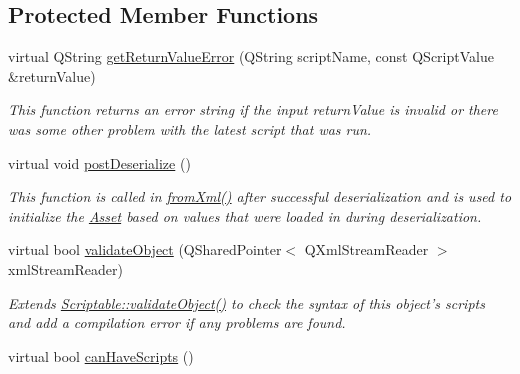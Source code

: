 \subsection*{Protected Member Functions}
\begin{DoxyCompactItemize}
\item 
virtual Q\-String \hyperlink{class_picto_1_1_script_controller_aa4cc92c24d03887890452e350cf5aac4}{get\-Return\-Value\-Error} (Q\-String script\-Name, const Q\-Script\-Value \&return\-Value)
\begin{DoxyCompactList}\small\item\em This function returns an error string if the input return\-Value is invalid or there was some other problem with the latest script that was run. \end{DoxyCompactList}\item 
virtual void \hyperlink{class_picto_1_1_script_controller_a8f67155393f4a6ee394120b5008befab}{post\-Deserialize} ()
\begin{DoxyCompactList}\small\item\em This function is called in \hyperlink{class_picto_1_1_asset_a8bed4da09ecb1c07ce0dab313a9aba67}{from\-Xml()} after successful deserialization and is used to initialize the \hyperlink{class_picto_1_1_asset}{Asset} based on values that were loaded in during deserialization. \end{DoxyCompactList}\item 
\hypertarget{class_picto_1_1_script_controller_a98107f46374aa1980fcba656d2f5fb97}{virtual bool \hyperlink{class_picto_1_1_script_controller_a98107f46374aa1980fcba656d2f5fb97}{validate\-Object} (Q\-Shared\-Pointer$<$ Q\-Xml\-Stream\-Reader $>$ xml\-Stream\-Reader)}\label{class_picto_1_1_script_controller_a98107f46374aa1980fcba656d2f5fb97}

\begin{DoxyCompactList}\small\item\em Extends \hyperlink{class_picto_1_1_scriptable_ab6e2944c43a3b5d418bf7b251594386d}{Scriptable\-::validate\-Object()} to check the syntax of this object's scripts and add a compilation error if any problems are found. \end{DoxyCompactList}\item 
\hypertarget{class_picto_1_1_script_controller_a553be0d62a7f4214dd74e2b56ccc966f}{virtual bool \hyperlink{class_picto_1_1_script_controller_a553be0d62a7f4214dd74e2b56ccc966f}{can\-Have\-Scripts} ()}\label{class_picto_1_1_script_controller_a553be0d62a7f4214dd74e2b56ccc966f}


\end{DoxyCompactItemize}
